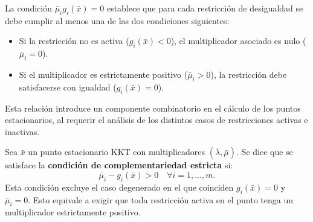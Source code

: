 \begin{notabox}
 La condición $\bar{\mu}_i g_i(\bar{x}) = 0$ establece que para cada restricción de desigualdad se debe cumplir al menos una de las dos condiciones siguientes:
 \begin{itemize}
 \item Si la restricción no es activa ($g_i(\bar{x}) < 0$), el multiplicador asociado es nulo ($\bar{\mu}_i = 0$).
 \item Si el multiplicador es estrictamente positivo ($\bar{\mu}_i > 0$), la restricción debe satisfacerse con igualdad ($g_i(\bar{x}) = 0$).
 \end{itemize}
 Esta relación introduce un componente combinatorio en el cálculo de los puntos estacionarios, al requerir el análisis de los distintos casos de restricciones activas e inactivas.
\end{notabox}

\begin{definition}\label{v1:def:complementariedad_estricta}
 Sea $\bar{x}$ un punto estacionario KKT con multiplicadores $(\bar{\lambda}, \bar{\mu})$. Se dice que se satisface la \textbf{condición de complementariedad estricta} si:
 \[
 \bar{\mu}_i - g_i(\bar{x}) > 0 \quad \forall i = 1, \dots, m.
 \]
 Esta condición excluye el caso degenerado en el que coinciden $g_i(\bar{x}) = 0$ y $\bar{\mu}_i = 0$. Esto equivale a exigir que toda restricción activa en el punto tenga un multiplicador estrictamente positivo.
\end{definition}


